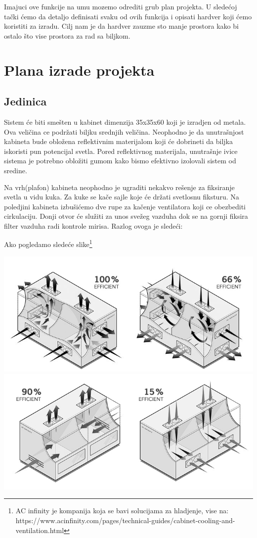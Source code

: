\documentclass[a4paper,11pt]{book}
\begin{document}
\noindent Imajuci ove funkcije na umu mozemo odrediti grub plan projekta. U sledećoj tački ćemo da detaljo definisati svaku od ovih funkcija i opisati hardver koji ćemo koristiti za izradu. Cilj nam je da hardver zauzme sto manje prostora kako bi ostalo što vise prostora za rad sa biljkom.

\section{Plana izrade projekta}

\subsection{Jedinica}

Sistem će biti smešten u kabinet dimenzija 35x35x60 koji je izradjen od metala. Ova veličina ce podržati biljku srednjih veličina. Neophodno je da unutrašnjost kabineta bude obložena reflektivnim materijalom koji će dobrineti da biljka iskoristi pun potencijal svetla. Pored reflektivnog materijala, unutrašnje ivice sistema je potrebno obložiti gumom kako bismo efektivno izolovali sistem od sredine.

Na vrh(plafon) kabineta neophodno je ugraditi nekakvo rešenje za fiksiranje svetla u vidu kuka. Za kuke se kače sajle koje će držati svetlosnu fiksturu. Na poledjini kabineta izbušićemo dve rupe za kačenje ventilatora koji ce obezbediti cirkulaciju. Donji otvor će služiti za unos svežeg vazduha dok se na gornji fiksira filter vazduha radi kontrole mirisa. Razlog ovoga je sledeći:

Ako pogledamo sledeće slike\footnote{AC infinity je kompanija koja se bavi solucijama za hladjenje, vise na: https://www.acinfinity.com/pages/technical-guides/cabinet-cooling-and-ventilation.html}

\includegraphics[width=\textwidth]{10060.jpg}
\includegraphics[width=\textwidth]{9015.jpg}
\end{document}
